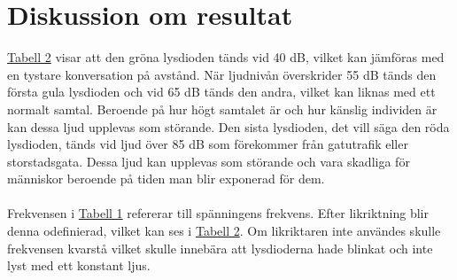 \documentclass[12pt]{report}
\begin{document}
\section{Diskussion om resultat}
\label{sec:discres}
\hyperref[tab:res2]{Tabell 2} visar att den gröna lysdioden tänds vid 40 dB, vilket kan jämföras med en tystare konversation på avstånd. När ljudnivån överskrider 55 dB tänds den första gula lysdioden och vid 65 dB tänds den andra, vilket kan liknas med ett normalt samtal. Beroende på hur högt samtalet är och hur känslig individen är kan dessa ljud upplevas som störande. Den sista lysdioden, det vill säga den röda lysdioden, tänds vid ljud över 85 dB som förekommer från gatutrafik eller storstadsgata. Dessa ljud kan upplevas som störande och vara skadliga för människor beroende på tiden man blir exponerad för dem.  
\\\\
Frekvensen i \hyperref[tab:res1]{Tabell 1} refererar till spänningens frekvens. Efter likriktning blir denna odefinierad, vilket kan ses i \hyperref[tab:res2]{Tabell 2}. Om likriktaren inte användes skulle frekvensen kvarstå vilket skulle innebära att lysdioderna hade blinkat och inte lyst med ett konstant ljus.
\end{document}
